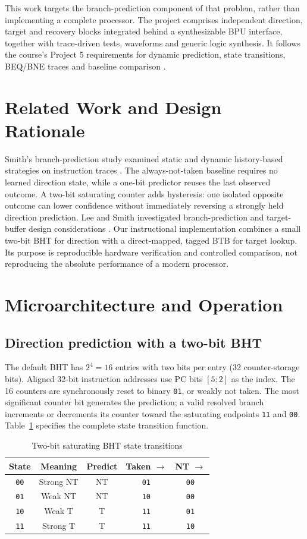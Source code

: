 \documentclass[conference,a4paper]{IEEEtran}
\begin{document}
This work targets the branch-prediction component of that problem, rather than implementing a complete processor. The project comprises independent direction, target and recovery blocks integrated behind a synthesizable BPU interface, together with trace-driven tests, waveforms and generic logic synthesis. It follows the course's Project 5 requirements for dynamic prediction, state transitions, BEQ/BNE traces and baseline comparison \cite{faculty,repo}.

\section{Related Work and Design Rationale}
Smith's branch-prediction study examined static and dynamic history-based strategies on instruction traces \cite{smith}. The always-not-taken baseline requires no learned direction state, while a one-bit predictor reuses the last observed outcome. A two-bit saturating counter adds hysteresis: one isolated opposite outcome can lower confidence without immediately reversing a strongly held direction prediction. Lee and Smith investigated branch-prediction and target-buffer design considerations \cite{lee}. Our instructional implementation combines a small two-bit BHT for direction with a direct-mapped, tagged BTB for target lookup. Its purpose is reproducible hardware verification and controlled comparison, not reproducing the absolute performance of a modern processor.

\section{Microarchitecture and Operation}
\subsection{Direction prediction with a two-bit BHT}
The default BHT has $2^{4}=16$ entries with two bits per entry (32 counter-storage bits). Aligned 32-bit instruction addresses use PC bits $[5:2]$ as the index. The 16 counters are synchronously reset to binary \texttt{01}, or weakly not taken. The most significant counter bit generates the prediction; a valid resolved branch increments or decrements its counter toward the saturating endpoints \texttt{11} and \texttt{00}. Table~\ref{tab:states} specifies the complete state transition function.

\begin{table}[t]
\caption{Two-bit saturating BHT state transitions}
\label{tab:states}
\centering
\begin{tabular}{@{}ccccc@{}}
\toprule
State & Meaning & Predict & Taken $\to$ & NT $\to$ \\
\midrule
\texttt{00} & Strong NT & NT & \texttt{01} & \texttt{00} \\
\texttt{01} & Weak NT & NT & \texttt{10} & \texttt{00} \\
\texttt{10} & Weak T & T & \texttt{11} & \texttt{01} \\
\texttt{11} & Strong T & T & \texttt{11} & \texttt{10} \\
\bottomrule
\end{tabular}
\end{table}
\end{document}
